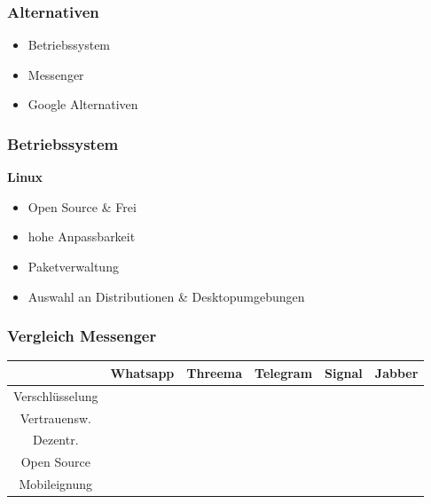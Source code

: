 
  \begin{frame}
    \frametitle{Alternativen}
    \begin{itemize}
      \item Betriebssystem
      \item Messenger
      \item Google Alternativen
    \end{itemize}
  \end{frame}
  
  \begin{frame}
    \frametitle{Betriebssystem}
    \textbf{Linux}
    \begin{itemize}
      \item Open Source \& Frei
      \item hohe Anpassbarkeit
      \item Paketverwaltung
      \item Auswahl an Distributionen \& Desktopumgebungen
    \end{itemize}
  \end{frame}
  
  \begin{frame}
    \frametitle{Vergleich Messenger}
    \begin{tabular}{cccccc}
      \hline
      & Whatsapp & Threema & Telegram & Signal & Jabber \\
      \hline
      Verschlüsselung & \cellcolor{green} & \cellcolor{yellow} & \cellcolor{orange} & \cellcolor{green} & \cellcolor{green} \\
      \hline
      Vertrauensw. & \cellcolor{red} & \cellcolor{yellow} & \cellcolor{orange} & \cellcolor{green} &       \cellcolor{green} \\
      \hline
      Dezentr. & \cellcolor{red} & \cellcolor{red} & \cellcolor{red} & \cellcolor{orange} & \cellcolor{green} \\
      \hline
      Open Source & \cellcolor{red} & \cellcolor{orange} & \cellcolor{yellow} & \cellcolor{green} & \cellcolor{green} \\
      \hline
      Mobileignung & \cellcolor{green} & \cellcolor{green} & \cellcolor{green} & \cellcolor{green} & \cellcolor{green} \\
      \hline
    \end{tabular}
  \end{frame}

